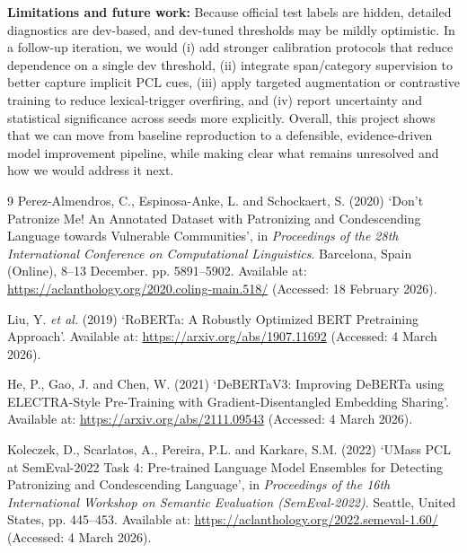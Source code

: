 \documentclass[11pt, a4paper]{article}
\begin{document}
\textbf{Limitations and future work:}
Because official test labels are hidden, detailed diagnostics are dev-based, and dev-tuned thresholds may be mildly optimistic. In a follow-up iteration, we would (i) add stronger calibration protocols that reduce dependence on a single dev threshold, (ii) integrate span/category supervision to better capture implicit PCL cues, (iii) apply targeted augmentation or contrastive training to reduce lexical-trigger overfiring, and (iv) report uncertainty and statistical significance across seeds more explicitly. Overall, this project shows that we can move from baseline reproduction to a defensible, evidence-driven model improvement pipeline, while making clear what remains unresolved and how we would address it next.
\newpage
\begin{thebibliography}{9}
  Perez-Almendros, C., Espinosa-Anke, L. and Schockaert, S. (2020) `Don't Patronize Me! An Annotated Dataset with Patronizing and Condescending Language towards Vulnerable Communities', in \textit{Proceedings of the 28th International Conference on Computational Linguistics}. Barcelona, Spain (Online), 8--13 December. pp. 5891--5902. Available at: \url{https://aclanthology.org/2020.coling-main.518/} (Accessed: 18 February 2026).

  Liu, Y. \textit{et al.} (2019) `RoBERTa: A Robustly Optimized BERT Pretraining Approach'. Available at: \url{https://arxiv.org/abs/1907.11692} (Accessed: 4 March 2026).

  He, P., Gao, J. and Chen, W. (2021) `DeBERTaV3: Improving DeBERTa using ELECTRA-Style Pre-Training with Gradient-Disentangled Embedding Sharing'. Available at: \url{https://arxiv.org/abs/2111.09543} (Accessed: 4 March 2026).

  Koleczek, D., Scarlatos, A., Pereira, P.L. and Karkare, S.M. (2022) `UMass PCL at SemEval-2022 Task 4: Pre-trained Language Model Ensembles for Detecting Patronizing and Condescending Language', in \textit{Proceedings of the 16th International Workshop on Semantic Evaluation (SemEval-2022)}. Seattle, United States, pp. 445--453. Available at: \url{https://aclanthology.org/2022.semeval-1.60/} (Accessed: 4 March 2026).
\end{thebibliography}
\end{document}
